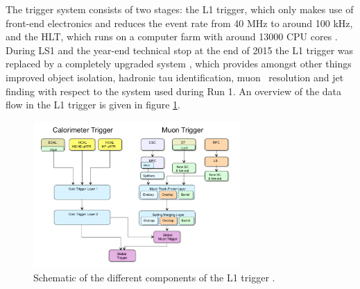 The trigger system consists of two stages: the \ac{L1} trigger, which only makes use of
front-end electronics 
and reduces the event rate from 40 MHz to around 100 kHz, and the
\ac{HLT}, which runs on a computer farm with around 13000 CPU cores \cite{cms-trigger}.
During \ac{LS1} and the year-end technical stop at the end of 2015 the \ac{L1} trigger was
replaced by a completely upgraded system \cite{cms-trigger-tdr}, which provides amongst other 
things improved object isolation, hadronic tau identification, muon \pT~resolution and
jet finding with respect to the system used during Run 1.
An overview of the data flow in the \ac{L1} trigger is given in figure \ref{fig:CMS_Trigger}.

\begin{figure}[h!]
\begin{center}
\includegraphics[width=0.7\textwidth]{./Detector/Plots/CMSTrigger.png}
\caption{Schematic of the different components of the \ac{L1} trigger \cite{cms-trigger-tdr}.}
\label{fig:CMS_Trigger}
\end{center}
\end{figure}


